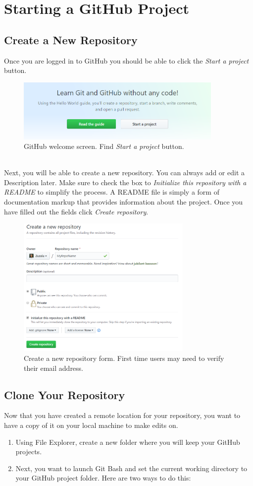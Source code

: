\documentclass[12pt]{article}
\begin{document}
\section{Starting a GitHub Project}
\subsection{Create a New Repository}
Once you are logged in to GitHub you should be able to click the \emph{Start a project} button.
\begin{figure}[h!]
  \includegraphics[width=10cm, center]{GitHub-Start-Project}
  \caption{GitHub welcome screen. Find \emph{Start a project} button.}
\end{figure} \\
Next, you will be able to create a new repository. You can always add or edit a Description later. Make sure to check the box to \emph{Initialize this repository with a README} to simplify the process. A README file is simply a form of documentation markup that provides information about the project. Once you have filled out the fields click \emph{Create repository}.
\begin{figure}[h!]
  \includegraphics[width=8.5cm, center]{GitHub-Create-Repo}
  \caption{Create a new repository form. First time users may need to verify their email address.}
\end{figure}

\subsection{Clone Your Repository}
Now that you have created a remote location for your repository, you want to have a copy of it on your local machine to make edits on.
    \begin{enumerate}
        \item Using File Explorer, create a new folder where you will keep your GitHub projects.
        \item Next, you want to launch Git Bash and set the current working directory to your GitHub project folder. Here are two ways to do this:
    \end{enumerate}
\end{document}
